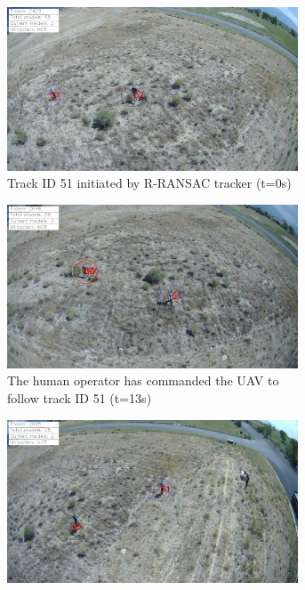 \begin{figure}[htbp]
	\begin{subfigure}{0.48\linewidth}
		\centering
		\includegraphics[width=0.95\textwidth]{images/chapter3/ID51_track_begin.png}
		\caption{Track ID 51 initiated by R-RANSAC tracker (t=0s)}
		\label{camera1}
	\end{subfigure}
	\begin{subfigure}{0.48\linewidth}
		\centering
		\includegraphics[width=0.95\textwidth]{images/chapter3/ID51_follow_begin.png}
		\caption{The human operator has commanded the UAV to follow track ID 51 (t=13s)}
		\label{camera2}
	\end{subfigure}
	\begin{subfigure}{0.48\linewidth}
		\centering
		\includegraphics[width=0.95\textwidth]{images/chapter3/ID65_track_begin.png}

\end{subfigure}
\end{figure}
